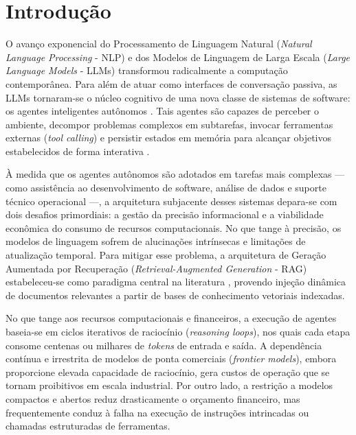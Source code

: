 \chapter{Introdução}\label{introducao}

O avanço exponencial do Processamento de Linguagem Natural (\textit{Natural Language Processing} - NLP) e dos Modelos de Linguagem de Larga Escala (\textit{Large Language Models} - LLMs) transformou radicalmente a computação contemporânea. Para além de atuar como interfaces de conversação passiva, as LLMs tornaram-se o núcleo cognitivo de uma nova classe de sistemas de software: os agentes inteligentes autônomos \cite{wang2024survey}. Tais agentes são capazes de perceber o ambiente, decompor problemas complexos em subtarefas, invocar ferramentas externas (\textit{tool calling}) e persistir estados em memória para alcançar objetivos estabelecidos de forma interativa \cite{deng2025asc}.

À medida que os agentes autônomos são adotados em tarefas mais complexas --- como assistência ao desenvolvimento de software, análise de dados e suporte técnico operacional ---, a arquitetura subjacente desses sistemas depara-se com dois desafios primordiais: a gestão da precisão informacional e a viabilidade econômica do consumo de recursos computacionais. No que tange à precisão, os modelos de linguagem sofrem de alucinações intrínsecas e limitações de atualização temporal. Para mitigar esse problema, a arquitetura de Geração Aumentada por Recuperação (\textit{Retrieval-Augmented Generation} - RAG) estabeleceu-se como paradigma central na literatura \cite{lewis2020retrieval}, provendo injeção dinâmica de documentos relevantes a partir de bases de conhecimento vetoriais indexadas.

No que tange aos recursos computacionais e financeiros, a execução de agentes baseia-se em ciclos iterativos de raciocínio (\textit{reasoning loops}), nos quais cada etapa consome centenas ou milhares de \textit{tokens} de entrada e saída. A dependência contínua e irrestrita de modelos de ponta comerciais (\textit{frontier models}), embora proporcione elevada capacidade de raciocínio, gera custos de operação que se tornam proibitivos em escala industrial. Por outro lado, a restrição a modelos compactos e abertos reduz drasticamente o orçamento financeiro, mas frequentemente conduz à falha na execução de instruções intrincadas ou chamadas estruturadas de ferramentas.


